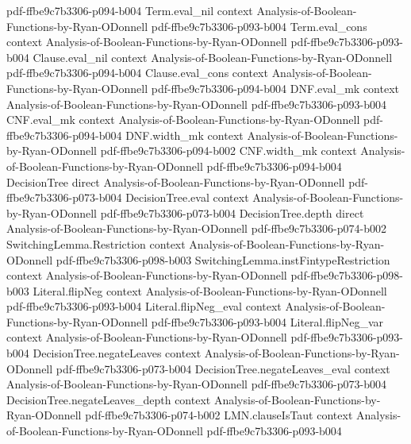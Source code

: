 \begin{lemma}
  {pdf-ffbe9c7b3306-p094-b004}
\proofstep
  {Term.eval_nil}
  {context}
  {Analysis-of-Boolean-Functions-by-Ryan-ODonnell}
  {pdf-ffbe9c7b3306-p093-b004}
\proofstep
  {Term.eval_cons}
  {context}
  {Analysis-of-Boolean-Functions-by-Ryan-ODonnell}
  {pdf-ffbe9c7b3306-p093-b004}
\proofstep
  {Clause.eval_nil}
  {context}
  {Analysis-of-Boolean-Functions-by-Ryan-ODonnell}
  {pdf-ffbe9c7b3306-p094-b004}
\proofstep
  {Clause.eval_cons}
  {context}
  {Analysis-of-Boolean-Functions-by-Ryan-ODonnell}
  {pdf-ffbe9c7b3306-p094-b004}
\proofstep
  {DNF.eval_mk}
  {context}
  {Analysis-of-Boolean-Functions-by-Ryan-ODonnell}
  {pdf-ffbe9c7b3306-p093-b004}
\proofstep
  {CNF.eval_mk}
  {context}
  {Analysis-of-Boolean-Functions-by-Ryan-ODonnell}
  {pdf-ffbe9c7b3306-p094-b004}
\proofstep
  {DNF.width_mk}
  {context}
  {Analysis-of-Boolean-Functions-by-Ryan-ODonnell}
  {pdf-ffbe9c7b3306-p094-b002}
\proofstep
  {CNF.width_mk}
  {context}
  {Analysis-of-Boolean-Functions-by-Ryan-ODonnell}
  {pdf-ffbe9c7b3306-p094-b004}
\proofstep
  {DecisionTree}
  {direct}
  {Analysis-of-Boolean-Functions-by-Ryan-ODonnell}
  {pdf-ffbe9c7b3306-p073-b004}
\proofstep
  {DecisionTree.eval}
  {context}
  {Analysis-of-Boolean-Functions-by-Ryan-ODonnell}
  {pdf-ffbe9c7b3306-p073-b004}
\proofstep
  {DecisionTree.depth}
  {direct}
  {Analysis-of-Boolean-Functions-by-Ryan-ODonnell}
  {pdf-ffbe9c7b3306-p074-b002}
\proofstep
  {SwitchingLemma.Restriction}
  {context}
  {Analysis-of-Boolean-Functions-by-Ryan-ODonnell}
  {pdf-ffbe9c7b3306-p098-b003}
\proofstep
  {SwitchingLemma.instFintypeRestriction}
  {context}
  {Analysis-of-Boolean-Functions-by-Ryan-ODonnell}
  {pdf-ffbe9c7b3306-p098-b003}
\proofstep
  {Literal.flipNeg}
  {context}
  {Analysis-of-Boolean-Functions-by-Ryan-ODonnell}
  {pdf-ffbe9c7b3306-p093-b004}
\proofstep
  {Literal.flipNeg_eval}
  {context}
  {Analysis-of-Boolean-Functions-by-Ryan-ODonnell}
  {pdf-ffbe9c7b3306-p093-b004}
\proofstep
  {Literal.flipNeg_var}
  {context}
  {Analysis-of-Boolean-Functions-by-Ryan-ODonnell}
  {pdf-ffbe9c7b3306-p093-b004}
\proofstep
  {DecisionTree.negateLeaves}
  {context}
  {Analysis-of-Boolean-Functions-by-Ryan-ODonnell}
  {pdf-ffbe9c7b3306-p073-b004}
\proofstep
  {DecisionTree.negateLeaves_eval}
  {context}
  {Analysis-of-Boolean-Functions-by-Ryan-ODonnell}
  {pdf-ffbe9c7b3306-p073-b004}
\proofstep
  {DecisionTree.negateLeaves_depth}
  {context}
  {Analysis-of-Boolean-Functions-by-Ryan-ODonnell}
  {pdf-ffbe9c7b3306-p074-b002}
\proofstep
  {LMN.clauseIsTaut}
  {context}
  {Analysis-of-Boolean-Functions-by-Ryan-ODonnell}
  {pdf-ffbe9c7b3306-p093-b004}
\proofstep

\end{lemma}
